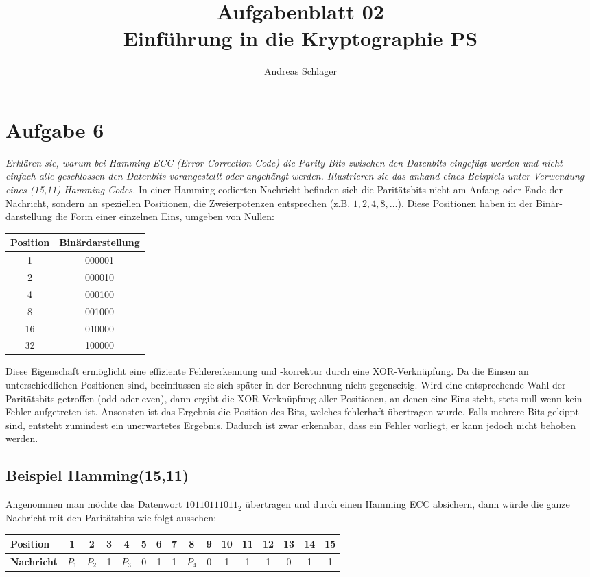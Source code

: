 \documentclass{article}
\title{{\Huge Aufgabenblatt 02}\\Einführung in die Kryptographie PS}
\author{Andreas Schlager}
\begin{document}
    \maketitle
    \section{Aufgabe 6}
    \textit{Erklären sie, warum bei Hamming ECC (Error Correction Code) die Parity Bits zwischen den Datenbits
    eingefügt werden und nicht einfach alle geschlossen den Datenbits vorangestellt oder
    angehängt werden. Illustrieren sie das anhand eines Beispiels unter Verwendung
    eines (15,11)-Hamming Codes.}\vspace*{1em}\newline
    In einer Hamming-codierten Nachricht befinden sich die Paritätsbits nicht am Anfang oder Ende der Nachricht, 
    sondern an speziellen Positionen, die Zweierpotenzen entsprechen (z.B. $1, 2, 4, 8, \dots$). 
    Diese Positionen haben in der Binär-darstellung die Form einer einzelnen Eins, umgeben von Nullen:
    \begin{center}
        \begin{tabular}{c|c} 
            \textbf{Position} & \textbf{Binärdarstellung}\\\hline
            1 & 000001\\
            2 & 000010\\
            4 & 000100\\
            8 & 001000\\
            16 & 010000\\
            32 & 100000
        \end{tabular}
    \end{center}
    Diese Eigenschaft ermöglicht eine effiziente Fehlererkennung und -korrektur durch eine XOR-Verknüpfung.
    Da die Einsen an unterschiedlichen Positionen sind, beeinflussen sie sich später in der Berechnung nicht gegenseitig.
    Wird eine entsprechende Wahl der Paritätsbits getroffen (odd oder even), dann ergibt die XOR-Verknüpfung 
    aller Positionen, an denen eine Eins steht, stets null wenn kein Fehler aufgetreten ist. Ansonsten ist das 
    Ergebnis die Position des Bits, welches fehlerhaft übertragen wurde. Falls mehrere Bits gekippt sind, 
    entsteht zumindest ein unerwartetes Ergebnis. Dadurch ist zwar erkennbar, dass ein Fehler vorliegt, 
    er kann jedoch nicht behoben werden.
    \subsection{Beispiel Hamming(15,11)}
    Angenommen man möchte das Datenwort $10110111011_2$ übertragen und durch einen Hamming ECC absichern,
    dann würde die ganze Nachricht mit den Paritätsbits wie folgt aussehen:
    \begin{center}
        \begin{tabular}{l|ccccccccccccccc}
            \textbf{Position} & 1 & 2 & 3 & 4 &5&6&7&8&9&10&11&12&13&14&15\\\hline
            \textbf{Nachricht} & $P_1$ & $P_2$ & 1 & $P_3$ &0&1&1&$P_4$& 0 & 1 & 1& 1 &0 & 1 & 1
        \end{tabular}
    \end{center}
\end{document}
